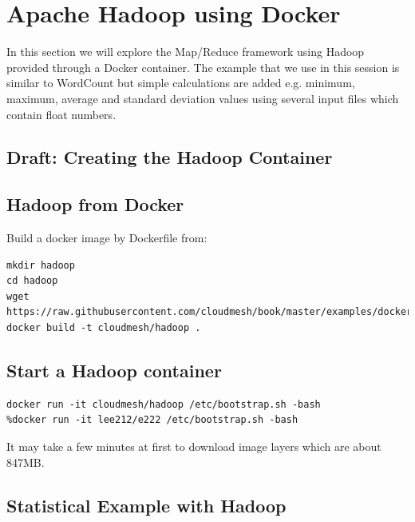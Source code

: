 \FILENAME

\section{Apache Hadoop using Docker}


In this section we will explore the 
Map/Reduce framework using Hadoop provided through a Docker
container. The example that we use in this session is similar to
WordCount but simple calculations are added e.g. minimum, maximum,
average and standard deviation values using several input files which
contain float numbers.

\subsection{Draft: Creating the Hadoop Container}

\subsection{Hadoop from Docker}

Build a docker image by Dockerfile from:

\begin{lstlisting}
mkdir hadoop
cd hadoop
wget https://raw.githubusercontent.com/cloudmesh/book/master/examples/docker/hadoop/Dockerfile
docker build -t cloudmesh/hadoop .
\end{lstlisting}


\subsection{Start a Hadoop container}

\begin{lstlisting}
docker run -it cloudmesh/hadoop /etc/bootstrap.sh -bash
%docker run -it lee212/e222 /etc/bootstrap.sh -bash
\end{lstlisting}

It may take a few minutes at first to download image layers which are
about 847MB.

\subsection{Statistical Example with Hadoop}       

